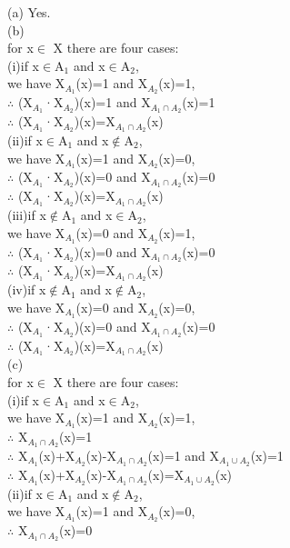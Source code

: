 \documentclass[11pt, a4paper, UTF8]{ctexart}
\begin{document}
\begin{solution}
(a) Yes.\\
(b)\\
for x$\in$ X there are four cases:\\
(i)if x$\in$A$_1$ and x$\in$A$_2$,\\
we have X$_{A_1}$(x)=1 and X$_{A_2}$(x)=1, \\
$\therefore$ (X$_{A_1}$·X$_{A_2}$)(x)=1 and X$_{A_1 \cap A_2}$(x)=1\\
$\therefore$ (X$_{A_1}$·X$_{A_2}$)(x)=X$_{A_1 \cap A_2}$(x)\\
(ii)if x$\in$A$_1$ and x$\notin$A$_2$, \\
we have X$_{A_1}$(x)=1 and X$_{A_2}$(x)=0, \\
$\therefore$ (X$_{A_1}$·X$_{A_2}$)(x)=0 and X$_{A_1 \cap A_2}$(x)=0\\
$\therefore$ (X$_{A_1}$·X$_{A_2}$)(x)=X$_{A_1 \cap A_2}$(x)\\
(iii)if x$\notin$A$_1$ and x$\in$A$_2$,\\
we have X$_{A_1}$(x)=0 and X$_{A_2}$(x)=1, \\
$\therefore$ (X$_{A_1}$·X$_{A_2}$)(x)=0 and X$_{A_1 \cap A_2}$(x)=0\\
$\therefore$ (X$_{A_1}$·X$_{A_2}$)(x)=X$_{A_1 \cap A_2}$(x)\\
(iv)if x$\notin$A$_1$ and x$\notin$A$_2$, \\
we have X$_{A_1}$(x)=0 and X$_{A_2}$(x)=0, \\
$\therefore$ (X$_{A_1}$·X$_{A_2}$)(x)=0 and X$_{A_1 \cap A_2}$(x)=0\\
$\therefore$ (X$_{A_1}$·X$_{A_2}$)(x)=X$_{A_1 \cap A_2}$(x)\\
(c)\\
for x$\in$ X there are four cases:\\
(i)if x$\in$A$_1$ and x$\in$A$_2$,\\
we have X$_{A_1}$(x)=1 and X$_{A_2}$(x)=1, \\
$\therefore$  X$_{A_1 \cap A_2}$(x)=1\\
$\therefore$ X$_{A_1}$(x)+X$_{A_2}$(x)-X$_{A_1 \cap A_2}$(x)=1  and X$_{A_1 \cup A_2}$(x)=1\\
$\therefore$ X$_{A_1}$(x)+X$_{A_2}$(x)-X$_{A_1 \cap A_2}$(x)=X$_{A_1 \cup A_2}$(x)\\
(ii)if x$\in$A$_1$ and x$\notin$A$_2$, \\
we have X$_{A_1}$(x)=1 and X$_{A_2}$(x)=0, \\
$\therefore$  X$_{A_1 \cap A_2}$(x)=0\\

\end{solution}
\end{document}
